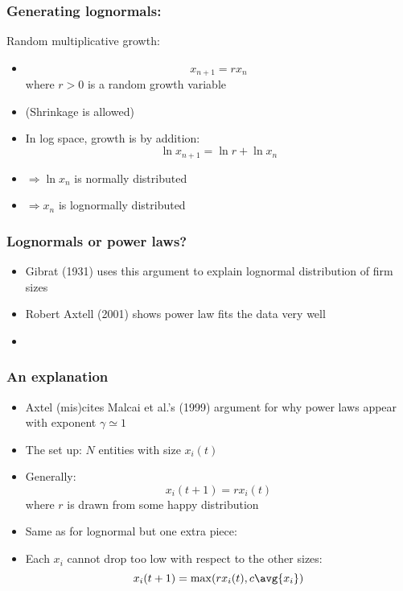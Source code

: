 \begin{frame}
  \frametitle{Generating lognormals:}

  \begin{block}{Random multiplicative growth:}
    \begin{itemize}
    \item<1->
      $$ x_{n+1} = r x_n$$
      where $r>0$ is a random growth variable
    \item<2-> (Shrinkage is allowed)
    \item<3->
      In log space, growth is by addition:
      $$ \ln x_{n+1} = \ln r + \ln x_n $$
    \item<4->
      $\Rightarrow \ln x_{n}$ is normally distributed
    \item<5->  
      $\Rightarrow x_{n}$ is lognormally distributed
    \end{itemize}
    
  \end{block}

\end{frame}

\begin{frame}
  \frametitle{Lognormals or power laws?}

  \begin{itemize}
  \item<1-> Gibrat\cite{gibrat1931a} (1931) uses this argument
    to explain lognormal distribution of firm sizes 
  \item<2-> Robert Axtell (2001) shows power
    law fits the data very well\cite{axtell2001a} 
  \item<3->
  \end{itemize}

\end{frame}


\begin{frame}
  \frametitle{An explanation}

  \begin{itemize}
  \item<1-> Axtel (mis)cites Malcai et al.'s (1999) argument\cite{malcai1999a}
    for why power laws appear with exponent $\gamma \simeq 1$
  \item<2-> The set up: $N$ entities with size $x_i(t)$
  \item<3-> 
    Generally:
    $$
    x_i(t+1) = rx_i(t) 
    $$
    where $r$ is drawn from some happy distribution
  \item<4-> 
    Same as for lognormal but one extra piece:
  \item<5-> 
    Each $x_i$ cannot drop too low with respect to the other sizes:
    $$
    x_i(t+1) = \max(rx_i(t),c\avg{x_i})
    $$
  \end{itemize}

\end{frame}

